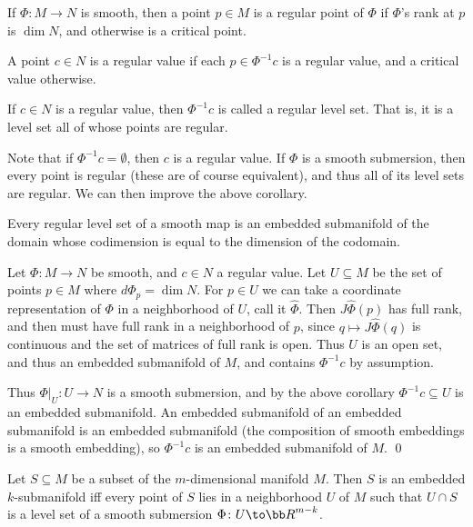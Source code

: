\ecoro

\bdefn

    If $\Phi\colon M\to N$ is smooth, then a point $p\in M$ is a {\emphcolor regular point} of $\Phi$ if $\Phi$'s rank at $p$ is $\dim N$,
    and otherwise is a {\emphcolor critical point}.

    A point $c\in N$ is a {\emphcolor regular value} if each $p\in\Phi^{-1}c$ is a regular value, and a {\emphcolor critical value} otherwise.

    If $c\in N$ is a regular value, then $\Phi^{-1}c$ is called a {\emphcolor regular level set}.
    That is, it is a level set all of whose points are regular.

\edefn

Note that if $\Phi^{-1}c=\emptyset$, then $c$ is a regular value.
If $\Phi$ is a smooth submersion, then every point is regular (these are of course equivalent), and thus all of its level sets are regular.
We can then improve the above corollary.

\bcoro

    Every regular level set of a smooth map is an embedded submanifold of the domain whose codimension is equal to the dimension of the codomain.

\ecoro

\bproof

    Let $\Phi\colon M\to N$ be smooth, and $c\in N$ a regular value.
    Let $U\subseteq M$ be the set of points $p\in M$ where $d\Phi_p=\dim N$.
    For $p\in U$ we can take a coordinate representation of $\Phi$ in a neighborhood of $U$, call it $\hat\Phi$.
    Then $J\hat\Phi(p)$ has full rank, and then must have full rank in a neighborhood of $p$, since $q\mapsto J\hat\Phi(q)$ is continuous
    and the set of matrices of full rank is open.
    Thus $U$ is an open set, and thus an embedded submanifold of $M$, and contains $\Phi^{-1}c$ by assumption.

    Thus $\Phi|_U\colon U\to N$ is a smooth submersion, and by the above corollary $\Phi^{-1}c\subseteq U$ is an embedded submanifold.
    An embedded submanifold of an embedded submanifold is an embedded submanifold (the composition of smooth embeddings is a smooth embedding), so $\Phi^{-1}c$
    is an embedded submanifold of $M$.
    \qed

\eproof

\bprop

    Let $S\subseteq M$ be a subset of the $m$-dimensional manifold $M$.
    Then $S$ is an embedded $k$-submanifold iff every point of $S$ lies in a neighborhood $U$ of $M$ such that
    $U\cap S$ is a level set of a smooth submersion $\Phi\colon U\to\bR^{m-k}$.

